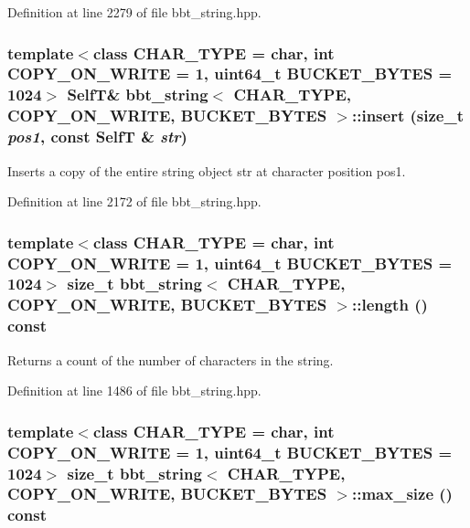 Definition at line 2279 of file bbt\_\-string.hpp.\hypertarget{classbbt__string_259cc9a9e878740d80a1be9d770c8106}{
\subsubsection[{insert}]{\setlength{\rightskip}{0pt plus 5cm}template$<$class CHAR\_\-TYPE  = char, int COPY\_\-ON\_\-WRITE = 1, uint64\_\-t BUCKET\_\-BYTES = 1024$>$ {\bf SelfT}\& {\bf bbt\_\-string}$<$ CHAR\_\-TYPE, COPY\_\-ON\_\-WRITE, BUCKET\_\-BYTES $>$::insert (size\_\-t {\em pos1}, \/  const {\bf SelfT} \& {\em str})}}
\label{classbbt__string_259cc9a9e878740d80a1be9d770c8106}


Inserts a copy of the entire string object str at character position pos1. 

Definition at line 2172 of file bbt\_\-string.hpp.\hypertarget{classbbt__string_09ba144b09ca3da53d028a4fd4209c1d}{
\subsubsection[{length}]{\setlength{\rightskip}{0pt plus 5cm}template$<$class CHAR\_\-TYPE  = char, int COPY\_\-ON\_\-WRITE = 1, uint64\_\-t BUCKET\_\-BYTES = 1024$>$ size\_\-t {\bf bbt\_\-string}$<$ CHAR\_\-TYPE, COPY\_\-ON\_\-WRITE, BUCKET\_\-BYTES $>$::length () const}}
\label{classbbt__string_09ba144b09ca3da53d028a4fd4209c1d}


Returns a count of the number of characters in the string. 

Definition at line 1486 of file bbt\_\-string.hpp.\hypertarget{classbbt__string_dad344768ef0b5b3349b37360ddf635c}{
\subsubsection[{max\_\-size}]{\setlength{\rightskip}{0pt plus 5cm}template$<$class CHAR\_\-TYPE  = char, int COPY\_\-ON\_\-WRITE = 1, uint64\_\-t BUCKET\_\-BYTES = 1024$>$ size\_\-t {\bf bbt\_\-string}$<$ CHAR\_\-TYPE, COPY\_\-ON\_\-WRITE, BUCKET\_\-BYTES $>$::max\_\-size () const}}
\label{classbbt__string_dad344768ef0b5b3349b37360ddf635c}


